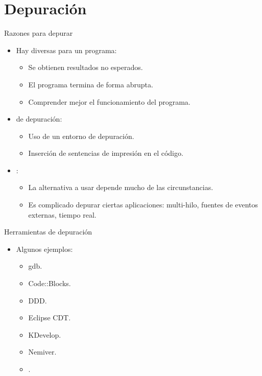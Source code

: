 \section{Depuración}

\begin{frame}[t]{Razones para depurar}
\begin{itemize}
  \item Hay diversas  para  un programa:
    \begin{itemize}
      \item Se obtienen resultados no esperados.
      \item El programa termina de forma abrupta.
      \item Comprender mejor el funcionamiento del programa.
    \end{itemize}

  \item {} de depuración:
    \begin{itemize}
      \item Uso de un entorno de depuración.
      \item Inserción de sentencias de impresión en el código.
    \end{itemize}

  \item {}:
    \begin{itemize}
      \item La alternativa a usar depende mucho de las circunstancias.
      \item Es complicado depurar ciertas aplicaciones: 
            multi-hilo, fuentes de eventos externas, tiempo real.
    \end{itemize}
\end{itemize}
\end{frame}

\begin{frame}[t]{Herramientas de depuración}
\begin{itemize}
  \item Algunos ejemplos:
    \begin{itemize}
      \item gdb.
      \item Code::Blocks.
      \item DDD.
      \item Eclipse CDT.
      \item KDevelop.
      \item Nemiver.
      \item {}.
    \end{itemize}
\end{itemize}
\end{frame}

